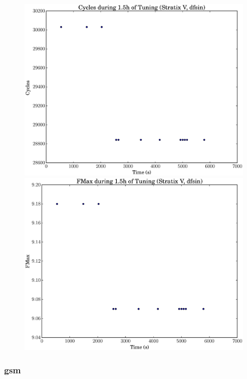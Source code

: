 \documentclass[12pt, a4paper]{article}
\begin{document}
\begin{figure}[htpb]
    \begin{minipage}{.48\textwidth}
        \includegraphics[scale=.25]{dfsin_cycles_5400_chstone_StratixV}
    \end{minipage}%
    \hfill
    \begin{minipage}{.48\textwidth}
        \includegraphics[scale=.25]{dfsin_fmax_5400_chstone_StratixV}
    \end{minipage}%
\end{figure}

\newpage

\subsubsection{gsm}
\end{document}
